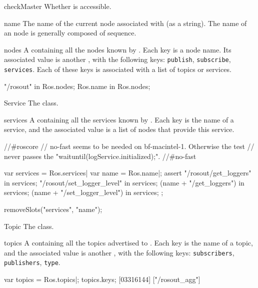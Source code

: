 \begin{urbiscriptapi}
\item[checkMaster]
  Whether  is accessible.


\item[name] The name of the current node associated with \urbi (as a
  string).  The name of an \urbi node is generally composed of
   sequence.


\item[nodes]%
  A  containing all the nodes known by
  . Each key is a node name. Its associated value is
  another , with the following keys: \lstinline{publish},
  \lstinline{subscribe}, \lstinline{services}.  Each of these keys is
  associated with a list of topics or services.
\begin{urbiassert}
"/rosout" in Ros.nodes;
Ros.name in Ros.nodes;
\end{urbiassert}


\item[Service]%
  The  class.


\item[services]%
  A  containing all the services known by
  . Each key is the name of a service, and the associated
  value is a list of nodes that provide this service.
\begin{urbicomment}
//#roscore
// no-fast seems to be needed on bf-macintel-1.  Otherwise the test
// never passes the "waituntil(logService.initialized);".
//#no-fast
\end{urbicomment}
\begin{urbiscript}
var services = Ros.services|
var name = Ros.name|;
assert
{
         "/rosout/get_loggers" in services;
    "/rosout/set_logger_level" in services;
       (name + "/get_loggers") in services;
  (name + "/set_logger_level") in services;
};
\end{urbiscript}
\begin{urbicomment}
removeSlots("services", "name");
\end{urbicomment}


\item[Topic]%
  The  class.


\item[topics]%
  A  containing all the topics advertised to
  . Each key is the name of a topic, and the associated
  value is another , with the following keys:
  \lstinline{subscribers}, \lstinline{publishers}, \lstinline{type}.
\begin{urbiscript}
var topics = Ros.topics|;
topics.keys;
[03316144] ["/rosout_agg"]


\end{urbiscript}
\end{urbiscriptapi}
